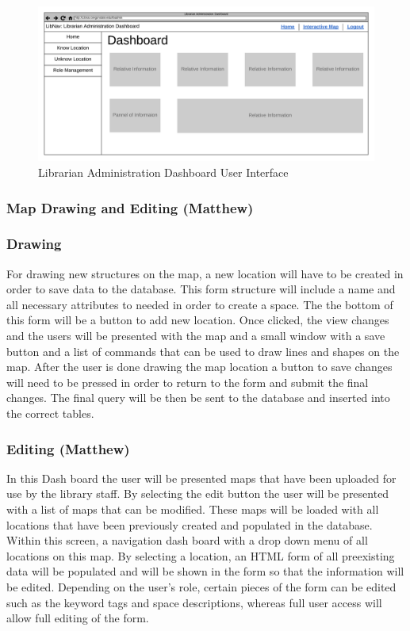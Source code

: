 \documentclass[letterpaper,10pt,titlepage, onecolumn, compsoc]{IEEEtran}
\begin{document}
\begin{figure}[h!]
\centering
\includegraphics[scale=.45]{images/librarian-administration-dashboard.png}
\caption{Librarian Administration Dashboard User Interface}
\label{fig:method}
\end{figure}

\subsubsection{Map Drawing and Editing (Matthew)}
\subsubsection{Drawing}
For drawing new structures on the map, a new location will have to be created in order to save data to the database. This form structure will include a name and all necessary attributes to needed in order to create a space. The the bottom of this form will be a button to add new location. Once clicked, the view changes and the users will be presented with the map and a small window with a save button and a list of commands that can be used to draw lines and shapes on the map. After the user is done drawing the map location a button to save changes will need to be pressed in order to return to the form and submit the final changes. The final query will be then be sent to the database and inserted into the correct tables.

\subsubsection{Editing (Matthew)} 
In this Dash board the user will be presented maps that have been uploaded for use by the library staff. By selecting the edit button the user will be presented with a list of maps that can be modified. These maps will be loaded with all locations that have been previously created and populated in the database. Within this screen, a navigation dash board with a drop down menu of all locations on this map. By selecting a location, an HTML form of all preexisting data will be populated and will be shown in the form so that the information will be edited. Depending on the user’s role, certain pieces of the form can be edited such as the keyword tags and space descriptions, whereas full user access will allow full editing of the form. 
\end{document}
